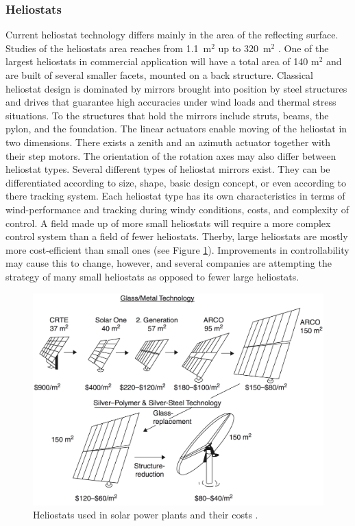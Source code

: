 \subsubsection{Heliostats}
Current heliostat technology differs mainly in the area of the reflecting surface. Studies of the heliostats area reaches from 1.1~m$^2$ up to 320~m$^2$ \cite{Tyner2014,Blackmon2012}. One of the largest heliostats in commercial application will have a total area of 140 m$^2$ \cite{Abengoa2014} and are built of several smaller facets, mounted on a back structure. Classical heliostat design is dominated by mirrors brought into position by steel structures and drives that guarantee high accuracies under wind loads and thermal stress situations. To the structures that hold the mirrors include struts, beams, the pylon, and the foundation. The linear actuators enable moving of the heliostat in two dimensions. There exists a zenith and an azimuth actuator together with their step motors. The orientation of the rotation axes may also differ between heliostat types. Several different types of heliostat mirrors exist. They can be differentiated according to size, shape, basic design concept, or even according to there tracking system. Each heliostat type has its own characteristics in terms of wind-performance and tracking during windy conditions, costs, and complexity of control. A field made up of more small heliostats will require a more complex control system than a field of fewer heliostats. Therby, large heliostats are mostly more cost-efficient than small ones (see Figure \ref{Heliostats}). Improvements in controllability may cause this to change, however, and several companies are attempting the strategy of many small heliostats as opposed to fewer large heliostats.
\begin{figure}[!h] 
\centering
\includegraphics[width=0.9\linewidth]{FIG/Heliostats}
\caption[Heliostats used in solar power plants and their costs.]{Heliostats used in solar power plants and their costs \cite{Kolb2007}.}\label{Heliostats}
\end{figure}

